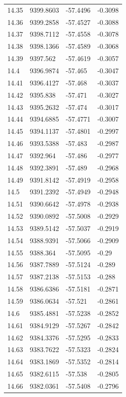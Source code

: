 \begin{table}[H]
\begin{tabular}{llll}
14.35 & 9399.8603 & -57.4496 & -0.3098 \\
14.36 & 9399.2858 & -57.4527 & -0.3088 \\
14.37 & 9398.7112 & -57.4558 & -0.3078 \\
14.38 & 9398.1366 & -57.4589 & -0.3068 \\
14.39 & 9397.562 & -57.4619 & -0.3057 \\
14.4 & 9396.9874 & -57.465 & -0.3047 \\
14.41 & 9396.4127 & -57.468 & -0.3037 \\
14.42 & 9395.838 & -57.471 & -0.3027 \\
14.43 & 9395.2632 & -57.474 & -0.3017 \\
14.44 & 9394.6885 & -57.4771 & -0.3007 \\
14.45 & 9394.1137 & -57.4801 & -0.2997 \\
14.46 & 9393.5388 & -57.483 & -0.2987 \\
14.47 & 9392.964 & -57.486 & -0.2977 \\
14.48 & 9392.3891 & -57.489 & -0.2968 \\
14.49 & 9391.8142 & -57.4919 & -0.2958 \\
14.5 & 9391.2392 & -57.4949 & -0.2948 \\
14.51 & 9390.6642 & -57.4978 & -0.2938 \\
14.52 & 9390.0892 & -57.5008 & -0.2929 \\
14.53 & 9389.5142 & -57.5037 & -0.2919 \\
14.54 & 9388.9391 & -57.5066 & -0.2909 \\
14.55 & 9388.364 & -57.5095 & -0.29 \\
14.56 & 9387.7889 & -57.5124 & -0.289 \\
14.57 & 9387.2138 & -57.5153 & -0.288 \\
14.58 & 9386.6386 & -57.5181 & -0.2871 \\
14.59 & 9386.0634 & -57.521 & -0.2861 \\
14.6 & 9385.4881 & -57.5238 & -0.2852 \\
14.61 & 9384.9129 & -57.5267 & -0.2842 \\
14.62 & 9384.3376 & -57.5295 & -0.2833 \\
14.63 & 9383.7622 & -57.5323 & -0.2824 \\
14.64 & 9383.1869 & -57.5352 & -0.2814 \\
14.65 & 9382.6115 & -57.538 & -0.2805 \\
14.66 & 9382.0361 & -57.5408 & -0.2796 \\

\end{tabular}
\end{table}
